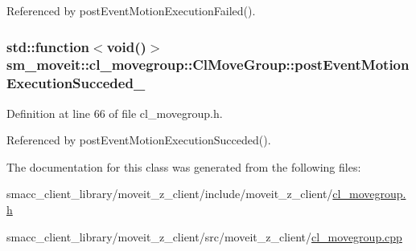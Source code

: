Referenced by post\+Event\+Motion\+Execution\+Failed().

\subsubsection[{\texorpdfstring{post\+Event\+Motion\+Execution\+Succeded\+\_\+}{postEventMotionExecutionSucceded_}}]{\setlength{\rightskip}{0pt plus 5cm}std\+::function$<$void()$>$ sm\+\_\+moveit\+::cl\+\_\+movegroup\+::\+Cl\+Move\+Group\+::post\+Event\+Motion\+Execution\+Succeded\+\_\+\hspace{0.3cm}{\ttfamily [private]}}\hypertarget{classsm__moveit_1_1cl__movegroup_1_1ClMoveGroup_aad5217efd0061eb0c6dd70550a53bdd2}{}\label{classsm__moveit_1_1cl__movegroup_1_1ClMoveGroup_aad5217efd0061eb0c6dd70550a53bdd2}


Definition at line 66 of file cl\+\_\+movegroup.\+h.



Referenced by post\+Event\+Motion\+Execution\+Succeded().



The documentation for this class was generated from the following files\+:\begin{DoxyCompactItemize}
\item 
smacc\+\_\+client\+\_\+library/moveit\+\_\+z\+\_\+client/include/moveit\+\_\+z\+\_\+client/\hyperlink{cl__movegroup_8h}{cl\+\_\+movegroup.\+h}\item 
smacc\+\_\+client\+\_\+library/moveit\+\_\+z\+\_\+client/src/moveit\+\_\+z\+\_\+client/\hyperlink{cl__movegroup_8cpp}{cl\+\_\+movegroup.\+cpp}\end{DoxyCompactItemize}
